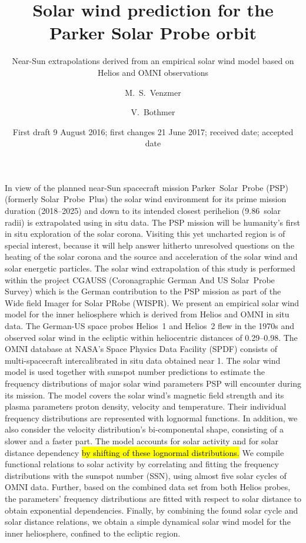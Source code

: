 
\title{Solar wind prediction for the Parker Solar Probe orbit}
\subtitle{Near-Sun extrapolations derived from an empirical solar wind model based on Helios and OMNI observations}

\author{M.~S.~Venzmer
\and V.~Bothmer}


\date{First draft 9 August 2016; first changes 21 June 2017; received date; accepted date }

\abstract
{\color{Green4} In view of the planned near-Sun spacecraft mission Parker~Solar~Probe (PSP) (formerly Solar~Probe~Plus) the solar wind environment for its prime mission duration (2018--2025) and down to its intended closest perihelion (\num{9.86}~solar radii) is extrapolated using in situ data. The PSP mission will be humanity's first in situ exploration of the solar corona. Visiting this yet uncharted region is of special interest, because it will help answer hitherto unresolved questions on the heating of the solar corona and the source and acceleration of the solar wind and solar energetic particles. The solar wind extrapolation of this study is performed within the project CGAUSS (Coronagraphic German And US Solar~Probe Survey) which is the German contribution to the PSP mission as part of the Wide field Imager for Solar PRobe (WISPR).}	%
{\color{Green4} We present an empirical solar wind model for the inner heliosphere which is derived from Helios and OMNI in situ data. The German-US space probes Helios~1 and Helios~2 flew in the 1970s and observed solar wind in the ecliptic within heliocentric distances of \SIrange{0.29}{0.98}{\au}. The OMNI database at NASA's Space Physics Data Facility (SPDF) consists of multi-spacecraft intercalibrated in situ data obtained near \SI{1}{\au}. The solar wind model is used together with sunspot number predictions to estimate the frequency distributions of major solar wind parameters PSP will encounter during its mission.}	%
{\color{Green4} The model covers the solar wind's magnetic field strength and its plasma parameters proton density, velocity and temperature.
Their individual frequency distributions are represented with lognormal functions. In addition, we also consider the velocity distribution's bi-componental shape, consisting of a slower and a faster part. The model accounts for solar activity and for solar distance dependency \hl{by shifting of these lognormal distributions.} We compile functional relations to solar activity by correlating and fitting the frequency distributions with the sunspot number (SSN), using almost five solar cycles of OMNI data. Further, based on the combined data set from both Helios probes, the parameters' frequency distributions are fitted with respect to solar distance to obtain exponential dependencies. Finally, by combining the found solar cycle and solar distance relations, we obtain a simple dynamical solar wind model for the inner heliosphere, confined to the ecliptic region.}	%
